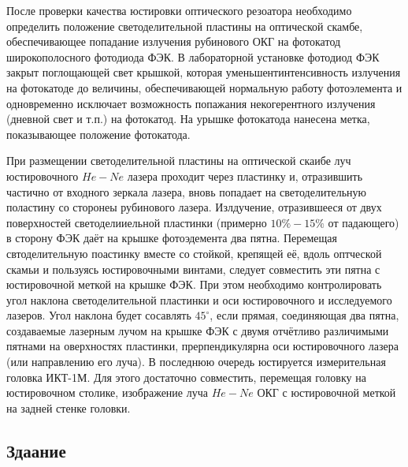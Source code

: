 \documentclass[a4paper,14pt,russian]{article}
\begin{document}
После проверки качества юстировки оптического резоатора необходимо определить положение светоделительной пластины на оптической скамбе, обеспечивающее попадание излучения рубинового ОКГ на фотокатод широкополосного фотодиода ФЭК. В лабораторной установке фотодиод ФЭК закрыт поглощающей свет крышкой, которая уменьшентинтенсивность излучения на фотокатоде до величины, обеспечивающей нормальную работу фотоэлемента и одновременно исключает возможность попажания некогерентного излучения (дневной свет и т.п.) на фотокатод. На урышке фотокатода нанесена метка, показывающее положение фотокатода.

При размещении светоделительной пластины на оптической скаибе луч юстировочного $He-Ne$ лазера проходит через пластинку и, отразившить частично от входного зеркала лазера, вновь попадает на светоделительную поластину со сторонеы рубинового лазера. Излдучение, отразившееся от двух поверхностей светоделииельной пластинки (примерно $10\% - 15\%$ от падающего) в сторону ФЭК даёт на крышке фотоэдемента два пятна. Перемещая свтоделительную поастинку вместе со стойкой, крепящей её, вдоль оптческой скамьи и пользуясь юстировочными винтами, следует совместить эти пятна с юстировочной меткой на крышке ФЭК. При этом необходимо контролировать угол наклона светоделительной пластинки и оси юстировочного и исследуемого лазеров. Угол наклона будет сосавлять $45 ^\circ$, если прямая, соединяющая два пятна, создаваемые лазерным лучом на крышке ФЭК с двумя отчётливо различимыми пятнами на оверхностях пластинки, прерпендикулярна оси юстировочного лазера (или направлению его луча). В последнюю очередь юстируется измерительная головка ИКТ-1М. Для этого достаточно совместить, перемещая головку на юстировочном столике, изображение луча $He-Ne$ ОКГ с юстировочной меткой на задней стенке головки.

\subsection{Здаание}
\end{document}
